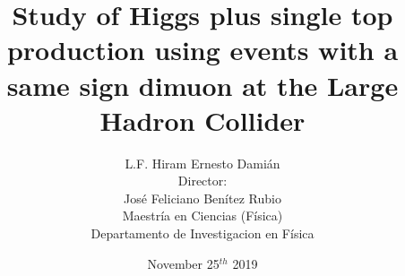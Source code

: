 \documentclass[11pt]{beamer}
\begin{document}
	\author{\tiny
			L.F. Hiram Ernesto Dami\'an\\
			\vspace{5px}
				Director:\\
					\vspace{5px}
			Jos\'e Feliciano Ben\'itez Rubio\\
				\vspace{5px}
				Maestr\'ia en Ciencias (F\'isica)\\
					\vspace{5px}
			 Departamento de Investigacion en F\'isica }
	\title{Study of Higgs plus single top production using events with a same sign dimuon  at the Large Hadron Collider}
	\newcommand{\nologo}{\setbeamertemplate{logo}{}}
	\date{\small November 25$^{th}$ 2019}
	\newcommand{\subf}[2]{%
		{\small\begin{tabular}[t]{@{}c@{}}
				#1\\#2
		\end{tabular}}%
	}
\begin{frame}
\titlepage
\end{frame}

\begin{frame}
\tiny
\tableofcontents
\end{frame}
\end{document}
